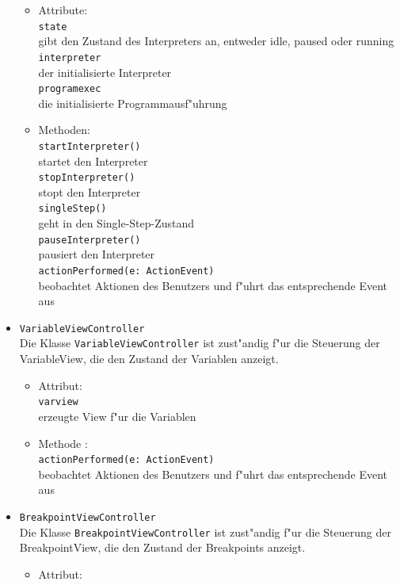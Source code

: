 \documentclass[10pt,a4paper,titlepage]{article}
\begin{document}
\begin{itemize}
\begin{itemize}
\item Attribute: \\
\texttt{state} \\
gibt den Zustand des Interpreters an, entweder idle, paused oder running
\texttt{interpreter} \\
der initialisierte Interpreter \\
\texttt{programexec} \\
die initialisierte Programmausf"uhrung 
\item Methoden: \\
\texttt{startInterpreter()} \\
startet den Interpreter \\
\texttt{stopInterpreter()} \\
stopt den Interpreter \\
\texttt{singleStep()} \\
geht in den Single-Step-Zustand \\
\texttt{pauseInterpreter()} \\
pausiert den Interpreter \\
\texttt{actionPerformed(e: ActionEvent)} \\
beobachtet Aktionen des Benutzers und f"uhrt das entsprechende Event aus
\end{itemize}
\item \texttt{VariableViewController} \\
Die Klasse \texttt{VariableViewController} ist zust"andig f"ur die Steuerung der VariableView, die den Zustand der Variablen anzeigt. 
\begin{itemize}
\item Attribut: \\
\texttt{varview} \\
erzeugte View f"ur die Variablen 
\item Methode :\\
\texttt{actionPerformed(e: ActionEvent)} \\
beobachtet Aktionen des Benutzers und f"uhrt das entsprechende Event aus
\end{itemize}
\item \texttt{BreakpointViewController} \\
Die Klasse \texttt{BreakpointViewController} ist zust"andig f"ur die Steuerung der BreakpointView, die den Zustand der Breakpoints anzeigt.
\begin{itemize}
\item Attribut: \\

\end{itemize}
\end{itemize}
\end{document}
